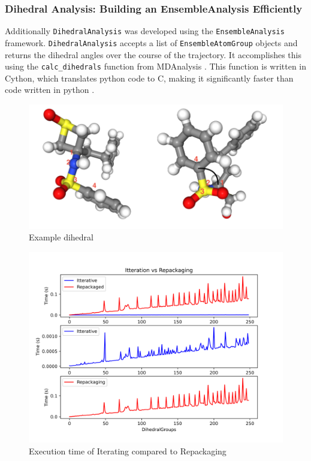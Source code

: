 \documentclass{article}[letterpaper, margins=1in, 12pt]
\begin{document}
\subsubsection{Dihedral Analysis: Building an EnsembleAnalysis Efficiently}

Additionally \texttt{DihedralAnalysis} was developed using the \texttt{EnsembleAnalysis} framework. \texttt{DihedralAnalysis} accepts a list of \texttt{EnsembleAtomGroup} objects and returns the dihedral angles over the course of the trajectory. It accomplishes this using the \lstinline{calc_dihedrals} function from MDAnalysis \cite{michaud-agrawal_mdanalysis_2011, gowers_mdanalysis_2016}. This function is written in Cython, which translates python code to C, making it significantly faster than code written in python \cite{Mull2018}. 

\begin{figure}[h]
    \centering
	\includegraphics[scale=0.5]{dihedral}
	\caption{Example dihedral}
	\label{fig:dihedral}
\end{figure}

\begin{figure}[h]
    \centering
    \includegraphics[scale=0.5]{time}
    \caption{Execution time of Iterating compared to Repackaging}
\end{figure}
\end{document}
